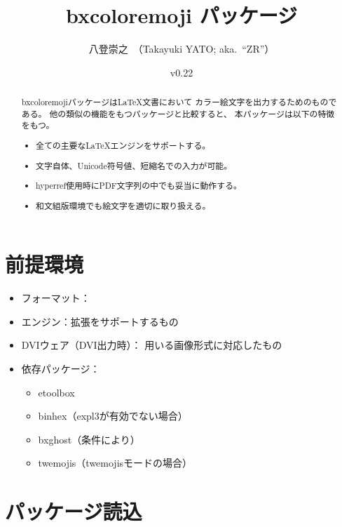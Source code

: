 \documentclass[a4paper]{ltjsarticle}
\newcommand{\PkgVersion}{0.22}
\newcommand{\PkgDate}{2024/09/16}
\newcommand{\Pkg}[1]{\textsf{#1}}
\newcommand{\Means}{：\quad}
\newcommand{\／}{\mbox{}／\mbox{}}
\begin{document}
\title{\Pkg{bxcoloremoji} パッケージ}
\author{八登崇之\ （Takayuki YATO; aka.~“ZR”）}
\date{v\PkgVersion\quad[\PkgDate]}
\maketitle

\begin{abstract}
\Pkg{bxcoloremoji}パッケージは{\LaTeX}文書において
カラー絵文字を出力するためのものである。
他の類似の機能をもつパッケージと比較すると、
本パッケージは以下の特徴をもつ。
\begin{itemize}
\item 全ての主要な{\LaTeX}エンジンをサポートする。
\item 文字自体、Unicode符号値、短縮名での入力が可能。
\item \Pkg{hyperref}使用時にPDF文字列の中でも妥当に動作する。
\item 和文組版環境でも絵文字を適切に取り扱える。
\end{itemize}
\end{abstract}

\tableofcontents


\section{前提環境}
\label{sec:Prerequisites}

\begin{itemize}
\item フォーマット\Means {\LaTeX}
\item エンジン\Means {\eTeX}拡張をサポートするもの
\item DVIウェア（DVI出力時）\Means
  用いる画像形式に対応したもの
\item 依存パッケージ\Means
  \begin{itemize}
  \item \Pkg{etoolbox}
  \item \Pkg{binhex}（expl3が有効でない場合）
  \item \Pkg{bxghost}（条件により）
  \item \Pkg{twemojis}（twemojisモードの場合）
  \end{itemize}
\end{itemize}


\section{パッケージ読込}
\label{sec:Loading}
\end{document}
